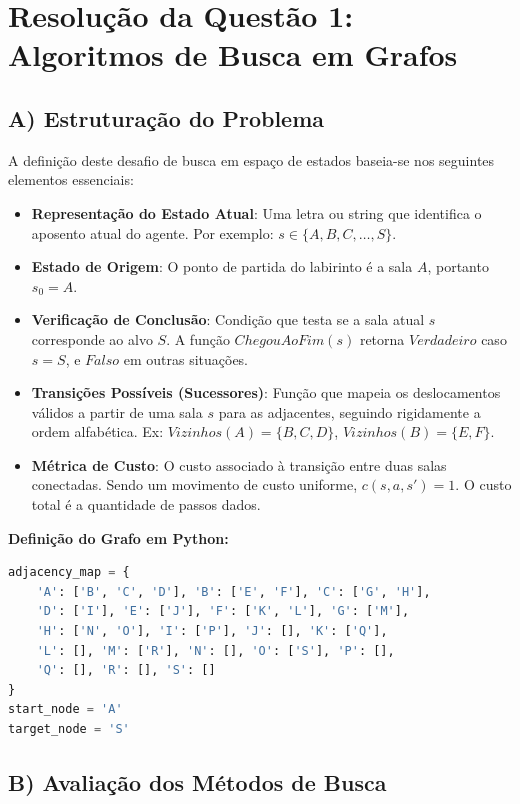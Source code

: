 \section*{Resolução da Questão 1: Algoritmos de Busca em Grafos}

\subsection*{A) Estruturação do Problema}

A definição deste desafio de busca em espaço de estados baseia-se nos seguintes elementos essenciais:

\begin{itemize}
    \item \textbf{Representação do Estado Atual}: Uma letra ou string que identifica o aposento atual do agente. Por exemplo: $s \in \{A, B, C, \dots, S\}$.
    \item \textbf{Estado de Origem}: O ponto de partida do labirinto é a sala $A$, portanto $s_0 = A$.
    \item \textbf{Verificação de Conclusão}: Condição que testa se a sala atual $s$ corresponde ao alvo $S$. A função $ChegouAoFim(s)$ retorna $Verdadeiro$ caso $s = S$, e $Falso$ em outras situações.
    \item \textbf{Transições Possíveis (Sucessores)}: Função que mapeia os deslocamentos válidos a partir de uma sala $s$ para as adjacentes, seguindo rigidamente a ordem alfabética. Ex: $Vizinhos(A) = \{B, C, D\}$, $Vizinhos(B) = \{E, F\}$.
    \item \textbf{Métrica de Custo}: O custo associado à transição entre duas salas conectadas. Sendo um movimento de custo uniforme, $c(s, a, s') = 1$. O custo total é a quantidade de passos dados.
\end{itemize}

\textbf{Definição do Grafo em Python:}
\begin{lstlisting}[language=Python]
adjacency_map = {
    'A': ['B', 'C', 'D'], 'B': ['E', 'F'], 'C': ['G', 'H'],
    'D': ['I'], 'E': ['J'], 'F': ['K', 'L'], 'G': ['M'],
    'H': ['N', 'O'], 'I': ['P'], 'J': [], 'K': ['Q'],
    'L': [], 'M': ['R'], 'N': [], 'O': ['S'], 'P': [],
    'Q': [], 'R': [], 'S': []
}
start_node = 'A'
target_node = 'S'
\end{lstlisting}

\subsection*{B) Avaliação dos Métodos de Busca}

